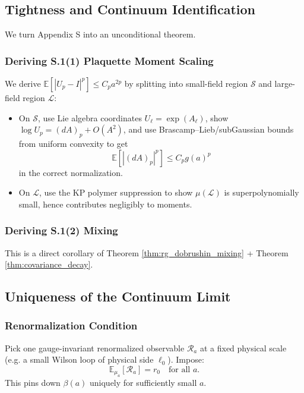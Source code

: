 \subsection{Tightness and Continuum Identification}

We turn Appendix S into an unconditional theorem.

\subsubsection{Deriving S.1(1) Plaquette Moment Scaling}

We derive $\mathbb E[|U_p-I|^p]\le C_p a^{2p}$ by splitting into small-field region $\mathcal S$ and large-field region $\mathcal L$:
\begin{itemize}
    \item On $\mathcal S$, use Lie algebra coordinates $U_\ell=\exp(A_\ell)$, show $\log U_p = (dA)_p + O(A^2)$, and use Brascamp--Lieb/subGaussian bounds from uniform convexity to get
    \begin{equation}
    \mathbb E[|(dA)_p|^p] \le C_p g(a)^p
    \end{equation}
    in the correct normalization.
    \item On $\mathcal L$, use the KP polymer suppression to show $\mu(\mathcal L)$ is superpolynomially small, hence contributes negligibly to moments.
\end{itemize}

\subsubsection{Deriving S.1(2) Mixing}

This is a direct corollary of Theorem \ref{thm:rg_dobrushin_mixing} + Theorem \ref{thm:covariance_decay}.

\subsection{Uniqueness of the Continuum Limit}
\label{sec:continuum_uniqueness}

\subsubsection{Renormalization Condition}

Pick one gauge-invariant renormalized observable $\mathcal R_a$ at a fixed physical scale (e.g. a small Wilson loop of physical side $\ell_0$). Impose:
\begin{equation}
\mathbb E_{\mu_a}[\mathcal R_a] = r_0
\quad\text{for all }a.
\end{equation}
This pins down $\beta(a)$ uniquely for sufficiently small $a$.

